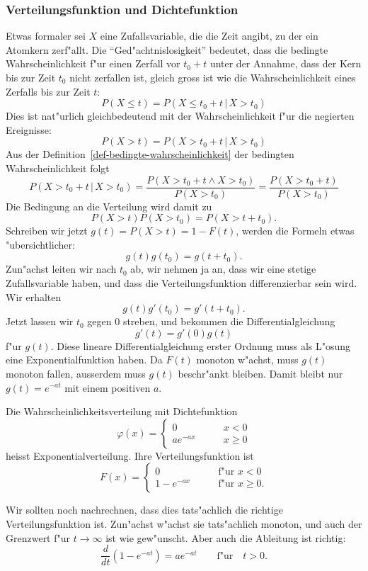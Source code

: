 \subsubsection{Verteilungsfunktion und Dichtefunktion}
Etwas formaler sei $X$ eine Zufallsvariable, die die Zeit angibt, zu der
ein Atomkern zerf"allt. Die ``Ged"achtnislosigkeit'' bedeutet, dass die
bedingte Wahrscheinlichkeit f"ur einen Zerfall vor $t_0+t$ unter der
Annahme, dass der Kern bis zur Zeit $t_0$ nicht zerfallen ist, gleich
gross ist wie die Wahrscheinlichkeit eines Zerfalls bis zur Zeit $t$:
\[
P(X \le t) = P(X\le t_0+t\,|\,X > t_0)
\]
Dies ist nat"urlich gleichbedeutend mit der Wahrscheinlichkeit f"ur
die negierten Ereignisse:
\[
P(X > t) = P(X > t_0+t\,|\,X > t_0)
\]
Aus der Definition~\ref{def-bedingte-wahrscheinlichkeit}
der bedingten Wahrscheinlichkeit folgt
\[
P(X> t_0+t\,|\,X>t_0)=\frac{P(X>t_0+t\wedge X>t_0)}{P(X > t_0)}
=\frac{P(X>t_0+t)}{P(X>t_0)}
\]
Die Bedingung an die Verteilung wird damit zu
\[
P(X>t)P(X>t_0)=P(X>t+t_0).
\]
Schreiben wir jetzt $g(t)=P(X>t)=1-F(t)$, werden die Formeln
etwas "ubersichtlicher:
\[
g(t)g(t_0)=g(t+t_0).
\]
Zun"achst leiten wir nach $t_0$ ab, wir nehmen ja an, dass wir
eine stetige Zufallsvariable haben, und dass die Verteilungsfunktion
differenzierbar sein wird.
Wir erhalten
\[
g(t)g'(t_0)=g'(t+t_0).
\]
Jetzt lassen wir $t_0$ gegen $0$ streben, und bekommen
die Differentialgleichung
\[
g'(t)=g'(0)g(t)
\]
f"ur $g(t)$.
Diese lineare Differentialgleichung erster Ordnung
muss als L"osung eine Exponentialfunktion haben. Da $F(t)$
monoton w"achst, muss $g(t)$ monoton fallen, ausserdem
muss $g(t)$ beschr"ankt bleiben. Damit bleibt nur
$g(t)=e^{-at}$ mit einem positiven $a$.

\begin{definition}
Die Wahrscheinlichkeitsverteilung mit Dichtefunktion
\[
\varphi(x)=\begin{cases}
0&\qquad x<0\\
a e^{-a x}&\qquad x\ge 0
\end{cases}
\]
heisst Exponentialverteilung. Ihre Verteilungsfunktion ist
\[
F(x)=\begin{cases}
0&\qquad\text{f"ur $x < 0$}\\
1-e^{-ax}&\qquad\text{f"ur $x\ge 0$}.
\end{cases}
\]
\end{definition}
Wir sollten noch nachrechnen, dass dies tats"achlich die richtige
Verteilungsfunktion ist. Zun"achst w"achst sie tats"achlich monoton,
und auch der Grenzwert f"ur $t\to\infty$ ist wie gew"unscht. Aber
auch die Ableitung ist richtig:
\[
\frac{d}{dt}(1-e^{-at})=ae^{-at}\qquad\text{f"ur}\quad t>0.
\]

